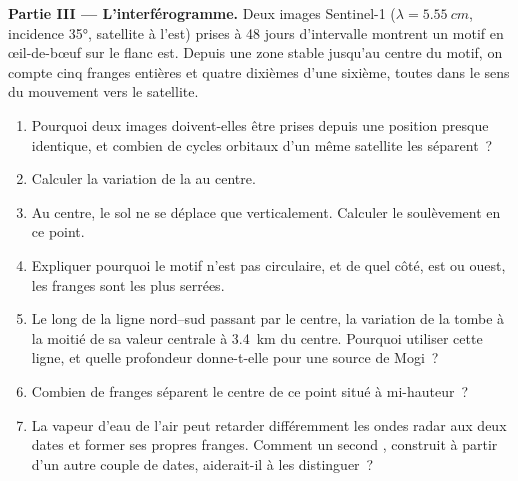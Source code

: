 \begin{problem}
\medskip\noindent\textbf{Partie III --- L'interférogramme.} Deux
images Sentinel-1 ($\lambda = \qty{5.55}{cm}$, incidence \ang{35}, satellite à
l'est) prises à 48 jours d'intervalle montrent un motif en œil-de-bœuf sur le flanc est. Depuis une
zone stable jusqu'au centre du motif, on compte cinq franges entières et
quatre dixièmes d'une sixième, toutes dans le sens du mouvement vers le
satellite.
\begin{enumerate}[resume]
\item Pourquoi deux images doivent-elles être prises depuis une position presque identique, et combien
  de cycles orbitaux d'un même satellite les séparent~?
\item Calculer la variation de la  au centre.
\item Au centre, le sol ne se déplace que verticalement. Calculer le soulèvement
  en ce point.
\item Expliquer pourquoi le motif n'est pas circulaire, et de quel côté, est ou
  ouest, les franges sont les plus serrées.
\item Le long de la ligne nord--sud passant par le centre, la variation de la
   tombe à la moitié de sa valeur centrale à \qty{3.4}{km} du
  centre. Pourquoi utiliser cette ligne, et quelle profondeur donne-t-elle pour une
  source de Mogi~?
\item Combien de franges séparent le centre de ce point situé à mi-hauteur~?
\item La vapeur d'eau de l'air peut retarder différemment les ondes radar aux
  deux dates et former ses propres franges. Comment un second ,
  construit à partir d'un autre couple de dates, aiderait-il à les distinguer~?
\end{enumerate}


\end{problem}
